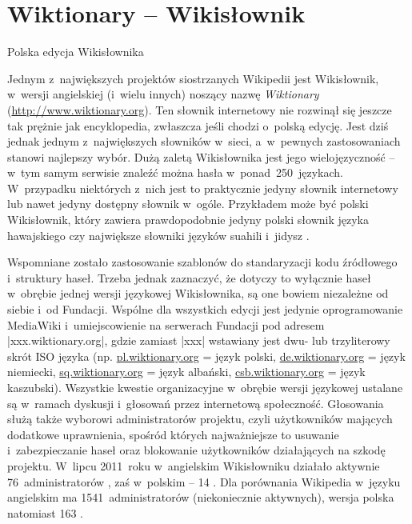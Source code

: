 \documentclass{pracamgr}
\begin{document}
\section{Wiktionary -- Wikisłownik}
\begin{illustration}
	\caption{Polska edycja Wikisłownika}
\end{illustration}
Jednym z~największych projektów siostrzanych Wikipedii jest Wikisłownik, w~wersji angielskiej (i~wielu innych) noszący nazwę \emph{Wiktionary} (\url{http://www.wiktionary.org}). Ten słownik internetowy nie rozwinął się jeszcze tak prężnie jak encyklopedia, zwłaszcza jeśli chodzi o~polską edycję. Jest dziś jednak jednym z~największych słowników w~sieci, a~w~pewnych zastosowaniach stanowi najlepszy wybór. Dużą zaletą Wikisłownika jest jego wielojęzyczność -- w~tym samym serwisie znaleźć można hasła w~ponad~250~językach. W~przypadku niektórych z~nich jest to praktycznie jedyny słownik internetowy lub nawet jedyny dostępny słownik w~ogóle. Przykładem może być polski Wikisłownik, który zawiera prawdopodobnie jedyny polski słownik języka hawajskiego czy największe słowniki języków suahili i~jidysz \cite{wikt:dlaczego}.

Wspomniane zostało zastosowanie szablonów do standaryzacji kodu źródłowego i~struktury haseł. Trzeba jednak zaznaczyć, że dotyczy to wyłącznie haseł w~obrębie jednej wersji językowej Wikisłownika, są one bowiem niezależne od siebie i~od Fundacji. Wspólne dla wszystkich edycji jest jedynie oprogramowanie MediaWiki i~umiejscowienie na serwerach Fundacji pod adresem \kod|xxx.wiktionary.org|, gdzie zamiast \kod|xxx| wstawiany jest dwu- lub trzyliterowy skrót ISO języka (np. \url{pl.wiktionary.org} = język polski, \url{de.wiktionary.org} = język niemiecki, \url{sq.wiktionary.org} = język albański, \url{csb.wiktionary.org} = język kaszubski). Wszystkie kwestie organizacyjne w~obrębie wersji językowej ustalane są w~ramach dyskusji i~głosowań przez internetową społeczność. Głosowania służą także wyborowi administratorów projektu, czyli użytkowników mających dodatkowe uprawnienia, spośród których najważniejsze to usuwanie i~zabezpieczanie haseł oraz blokowanie użytkowników działających na szkodę projektu. W~lipcu 2011~roku w~angielskim Wikisłowniku działało aktywnie 76~administratorów \cite{enwikt:admin}, zaś w~polskim -- 14 \cite{wikt:admin}. Dla porównania Wikipedia w~języku angielskim ma 1541~administratorów (niekoniecznie aktywnych), wersja polska natomiast 163 \cite{wiki:admin}.
\end{document}
